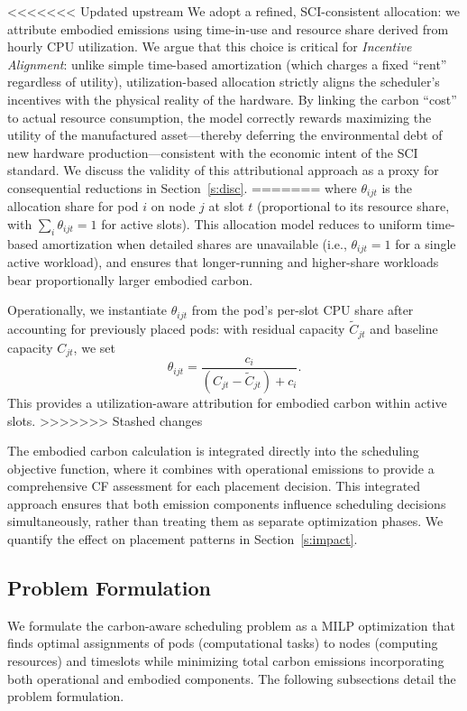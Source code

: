 \documentclass[10pt,journal,compsoc]{IEEEtran}
\begin{document}
<<<<<<< Updated upstream
We adopt a refined, SCI-consistent allocation: we attribute embodied emissions using time-in-use and resource share derived from hourly CPU utilization. We argue that this choice is critical for \emph{Incentive Alignment}: unlike simple time-based amortization (which charges a fixed ``rent'' regardless of utility), utilization-based allocation strictly aligns the scheduler's incentives with the physical reality of the hardware. By linking the carbon ``cost'' to actual resource consumption, the model correctly rewards maximizing the utility of the manufactured asset---thereby deferring the environmental debt of new hardware production---consistent with the economic intent of the SCI standard. We discuss the validity of this attributional approach as a proxy for consequential reductions in Section~\ref{s:disc}.
=======
where $\theta_{ijt}$ is the allocation share for pod $i$ on node $j$ at slot $t$ (proportional to its resource share, with $\sum_i \theta_{ijt}=1$ for active slots). This allocation model reduces to uniform time-based amortization when detailed shares are unavailable (i.e., $\theta_{ijt}=1$ for a single active workload), and ensures that longer-running and higher-share workloads bear proportionally larger embodied carbon.

Operationally, we instantiate $\theta_{ijt}$ from the pod's per-slot CPU share after accounting for previously placed pods: with residual capacity $\tilde C_{jt}$ and baseline capacity $C_{jt}$, we set
\begin{equation*}
\theta_{ijt} = \frac{c_i}{(C_{jt} - \tilde C_{jt}) + c_i}.
\end{equation*}
This provides a utilization-aware attribution for embodied carbon within active slots.
>>>>>>> Stashed changes

The embodied carbon calculation is integrated directly into the scheduling objective function, where it combines with operational emissions to provide a comprehensive CF assessment for each placement decision. This integrated approach ensures that both emission components influence scheduling decisions simultaneously, rather than treating them as separate optimization phases. We quantify the effect on placement patterns in Section~\ref{s:impact}.

\subsection{Problem Formulation}\label{s:prob}

We formulate the carbon-aware scheduling problem as a MILP optimization that finds optimal assignments of pods (computational tasks) to nodes (computing resources) and timeslots while minimizing total carbon emissions incorporating both operational and embodied components. The following subsections detail the problem formulation. 
\end{document}
